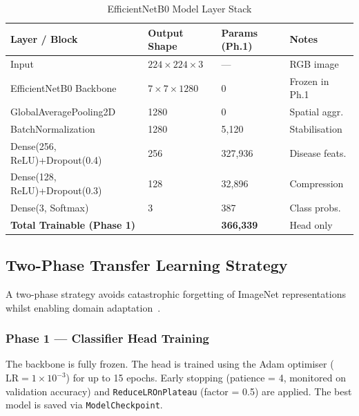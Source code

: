 \documentclass[12pt, a4paper, onecolumn]{IEEEtran}
\begin{document}
\begin{table}[H]
  \centering
  \caption{EfficientNetB0 Model Layer Stack}
  \label{tab:layers}
  \begin{tabularx}{\linewidth}{llll}
    \toprule
    \textbf{Layer / Block} & \textbf{Output Shape} & \textbf{Params (Ph.1)} & \textbf{Notes} \\
    \midrule
    Input                         & $224\!\times\!224\!\times\!3$ & ---     & RGB image \\
    EfficientNetB0 Backbone       & $7\!\times\!7\!\times\!1280$  & 0       & Frozen in Ph.1 \\
    GlobalAveragePooling2D        & 1280                          & 0       & Spatial aggr. \\
    BatchNormalization            & 1280                          & 5,120   & Stabilisation \\
    Dense(256, ReLU)+Dropout(0.4) & 256                           & 327,936 & Disease feats. \\
    Dense(128, ReLU)+Dropout(0.3) & 128                           & 32,896  & Compression \\
    Dense(3, Softmax)             & 3                             & 387     & Class probs. \\
    \midrule
    \multicolumn{2}{l}{\textbf{Total Trainable (Phase 1)}} & \textbf{366,339} & Head only \\
    \bottomrule
  \end{tabularx}
\end{table}

\subsection{Two-Phase Transfer Learning Strategy}

A two-phase strategy avoids catastrophic forgetting of ImageNet representations whilst enabling
domain adaptation~\cite{pan2010}.

\subsubsection{Phase 1 --- Classifier Head Training}

The backbone is fully frozen. The head is trained using the Adam optimiser
($\text{LR} = 1\times10^{-3}$) for up to 15 epochs. Early stopping (patience = 4, monitored on
validation accuracy) and \texttt{ReduceLROnPlateau} (factor = 0.5) are applied. The best model
is saved via \texttt{ModelCheckpoint}.
\end{document}
